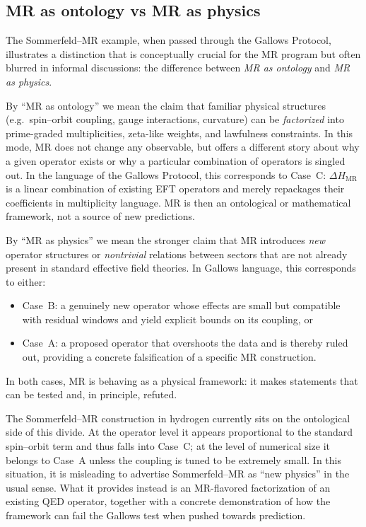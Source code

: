 \documentclass[11pt,a4paper]{article}
\newcommand{\DeltaHM}{\Delta H_{\mathrm{MR}}}
\begin{document}
\subsection{MR as ontology vs MR as physics}
\label{sec:ontology-vs-physics}

The Sommerfeld--MR example, when passed through the Gallows Protocol,
illustrates a distinction that is conceptually crucial for the MR
program but often blurred in informal discussions: the difference
between \emph{MR as ontology} and \emph{MR as physics}.

By ``MR as ontology'' we mean the claim that familiar physical
structures (e.g.\ spin--orbit coupling, gauge interactions, curvature)
can be \emph{factorized} into prime-graded multiplicities, zeta-like
weights, and lawfulness constraints. In this mode, MR does not change
any observable, but offers a different story about why a given operator
exists or why a particular combination of operators is singled out. In
the language of the Gallows Protocol, this corresponds to Case~C:
$\DeltaHM$ is a linear combination of existing EFT operators and merely
repackages their coefficients in multiplicity language. MR is then an
ontological or mathematical framework, not a source of new predictions.

By ``MR as physics'' we mean the stronger claim that MR introduces
\emph{new} operator structures or \emph{nontrivial} relations between
sectors that are not already present in standard effective field
theories. In Gallows language, this corresponds to either:
\begin{itemize}
  \item Case~B: a genuinely new operator whose effects are small but
    compatible with residual windows and yield explicit bounds on its
    coupling, or
  \item Case~A: a proposed operator that overshoots the data and is
    thereby ruled out, providing a concrete falsification of a specific
    MR construction.
\end{itemize}
In both cases, MR is behaving as a physical framework: it makes
statements that can be tested and, in principle, refuted.

The Sommerfeld--MR construction in hydrogen currently sits on the
ontological side of this divide. At the operator level it appears
proportional to the standard spin--orbit term and thus falls into
Case~C; at the level of numerical size it belongs to Case~A unless the
coupling is tuned to be extremely small. In this situation, it is
misleading to advertise Sommerfeld--MR as ``new physics'' in the usual
sense. What it provides instead is an MR-flavored factorization of an
existing QED operator, together with a concrete demonstration of how the
framework can fail the Gallows test when pushed towards prediction.
\end{document}
